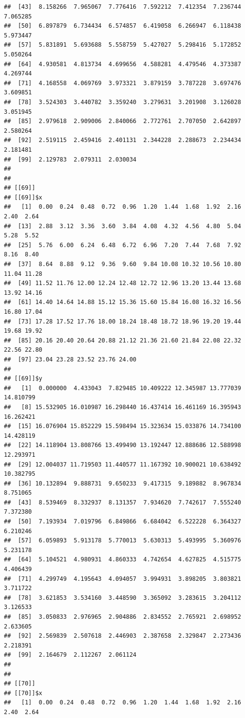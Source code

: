 \documentclass[
  ignorenonframetext,
]{beamer}
\begin{document}
\begin{frame}[fragile]{}
\begin{verbatim}
##  [43]  8.158266  7.965067  7.776416  7.592212  7.412354  7.236744  7.065285
##  [50]  6.897879  6.734434  6.574857  6.419058  6.266947  6.118438  5.973447
##  [57]  5.831891  5.693688  5.558759  5.427027  5.298416  5.172852  5.050264
##  [64]  4.930581  4.813734  4.699656  4.588281  4.479546  4.373387  4.269744
##  [71]  4.168558  4.069769  3.973321  3.879159  3.787228  3.697476  3.609851
##  [78]  3.524303  3.440782  3.359240  3.279631  3.201908  3.126028  3.051945
##  [85]  2.979618  2.909006  2.840066  2.772761  2.707050  2.642897  2.580264
##  [92]  2.519115  2.459416  2.401131  2.344228  2.288673  2.234434  2.181481
##  [99]  2.129783  2.079311  2.030034
## 
## 
## [[69]]
## [[69]]$x
##   [1]  0.00  0.24  0.48  0.72  0.96  1.20  1.44  1.68  1.92  2.16  2.40  2.64
##  [13]  2.88  3.12  3.36  3.60  3.84  4.08  4.32  4.56  4.80  5.04  5.28  5.52
##  [25]  5.76  6.00  6.24  6.48  6.72  6.96  7.20  7.44  7.68  7.92  8.16  8.40
##  [37]  8.64  8.88  9.12  9.36  9.60  9.84 10.08 10.32 10.56 10.80 11.04 11.28
##  [49] 11.52 11.76 12.00 12.24 12.48 12.72 12.96 13.20 13.44 13.68 13.92 14.16
##  [61] 14.40 14.64 14.88 15.12 15.36 15.60 15.84 16.08 16.32 16.56 16.80 17.04
##  [73] 17.28 17.52 17.76 18.00 18.24 18.48 18.72 18.96 19.20 19.44 19.68 19.92
##  [85] 20.16 20.40 20.64 20.88 21.12 21.36 21.60 21.84 22.08 22.32 22.56 22.80
##  [97] 23.04 23.28 23.52 23.76 24.00
## 
## [[69]]$y
##   [1]  0.000000  4.433043  7.829485 10.409222 12.345987 13.777039 14.810799
##   [8] 15.532905 16.010987 16.298440 16.437414 16.461169 16.395943 16.262421
##  [15] 16.076904 15.852229 15.598494 15.323634 15.033876 14.734100 14.428119
##  [22] 14.118904 13.808766 13.499490 13.192447 12.888686 12.588998 12.293971
##  [29] 12.004037 11.719503 11.440577 11.167392 10.900021 10.638492 10.382795
##  [36] 10.132894  9.888731  9.650233  9.417315  9.189882  8.967834  8.751065
##  [43]  8.539469  8.332937  8.131357  7.934620  7.742617  7.555240  7.372380
##  [50]  7.193934  7.019796  6.849866  6.684042  6.522228  6.364327  6.210246
##  [57]  6.059893  5.913178  5.770013  5.630313  5.493995  5.360976  5.231178
##  [64]  5.104521  4.980931  4.860333  4.742654  4.627825  4.515775  4.406439
##  [71]  4.299749  4.195643  4.094057  3.994931  3.898205  3.803821  3.711722
##  [78]  3.621853  3.534160  3.448590  3.365092  3.283615  3.204112  3.126533
##  [85]  3.050833  2.976965  2.904886  2.834552  2.765921  2.698952  2.633605
##  [92]  2.569839  2.507618  2.446903  2.387658  2.329847  2.273436  2.218391
##  [99]  2.164679  2.112267  2.061124
## 
## 
## [[70]]
## [[70]]$x
##   [1]  0.00  0.24  0.48  0.72  0.96  1.20  1.44  1.68  1.92  2.16  2.40  2.64

\end{verbatim}
\end{frame}
\end{document}
